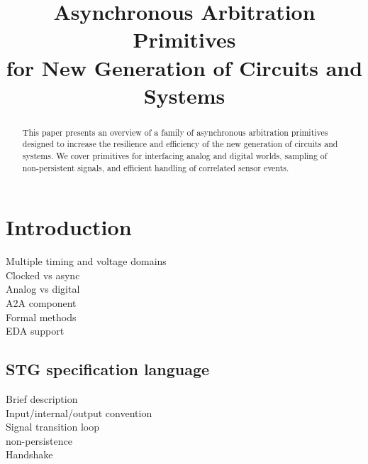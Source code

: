 \documentclass[conference]{IEEEtran}
\begin{document}
\title{Asynchronous Arbitration Primitives\\for New Generation of Circuits and Systems}

\author{
}

\maketitle

\begin{abstract}
This paper presents an overview of a family of asynchronous arbitration
primitives designed to increase the resilience and efficiency of
the new generation of circuits and systems. We cover primitives for
interfacing analog and digital worlds, sampling of non-persistent
signals, and efficient handling of correlated sensor events.
\end{abstract}


\section{Introduction}

Multiple timing and voltage domains\\
Clocked vs async\\
Analog vs digital\\
A2A component\\
Formal methods\\
EDA support\\

\subsection{STG specification language}

Brief description\\

Input/internal/output convention\\

Signal transition loop\\

non-persistence\\

Handshake\\
\end{document}
